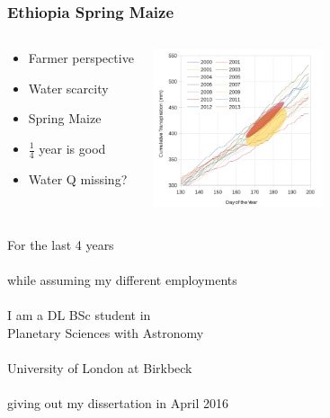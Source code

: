 \documentclass[serif,mathserif]{beamer}
\begin{document}

\begin{frame}
  \frametitle{Ethiopia Spring Maize}
\begin{columns}
\begin{center}
\begin{itemize}
 \item Farmer perspective
 \item Water scarcity
 \item Spring Maize
 \item $\frac{1}{4}$ year is good
 \item Water Q missing?
\end{itemize}
\end{center}

\begin{center}
 \includegraphics[width=5cm]{EthiopiaSpringMaize.png}
\end{center}
\end{columns}
\end{frame}


\begin{frame}
\begin{center}
For the last 4 years\\
\ \\
while assuming my different employments\pause\\
\ \\
I am a DL BSc student in \\Planetary Sciences with Astronomy\pause\\
\ \\
University of London at Birkbeck\pause\\
\ \\
giving out my dissertation in April 2016
\end{center}
\end{frame}

\end{document}

